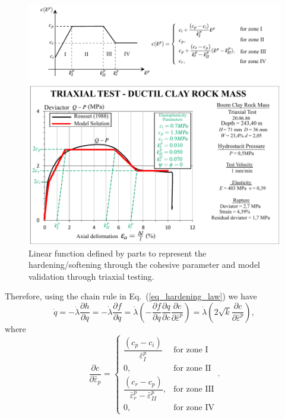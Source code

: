 \documentclass[Journal,letterpaper]{ascelike-new}
\begin{document}
\begin{figure}
	\centering
	\includegraphics[scale=1]{FIG1A.pdf}
	\caption{Linear function defined by parts to represent the hardening/softening through the cohesive parameter and model validation through triaxial testing.}
	\label{choesive parameter}
\end{figure}

Therefore, using the chain rule in Eq.~(\ref{eq_hardening_law}) we have 
\begin{equation}
	\label{eq:expressao_amolecimento}
	\dot q = - \dot \lambda \dfrac{\partial h}{\partial q} = - \dot \lambda \dfrac{\partial f}{\partial q} = \dot \lambda \left(- \dfrac{\partial f}{\partial q}\dfrac{\partial q}{\partial c}\dfrac{\partial c}{\partial \bar \varepsilon^p}\right) = \dot \lambda \left(2\sqrt{k} \dfrac{\partial c}{\partial \bar \varepsilon^p}\right),	
\end{equation}
where
\begin{equation}
	\label{eq:dqde}
	\dfrac{\partial c}{\partial \bar \varepsilon_{p}} = \left\{ \begin{array}{ll} \dfrac{(c_p-c_i)}{\bar \varepsilon^p_I} &  \text{for zone I} \\ 
		0, & \text{for zone II} \\
		\dfrac{(c_r-c_p)}{\bar \varepsilon^p_{r}-\bar \varepsilon^p_{II}}, & \text{for zone III} \\	
		0, & \text{for zone IV}
	\end{array}\right..
\end{equation}
\end{document}
